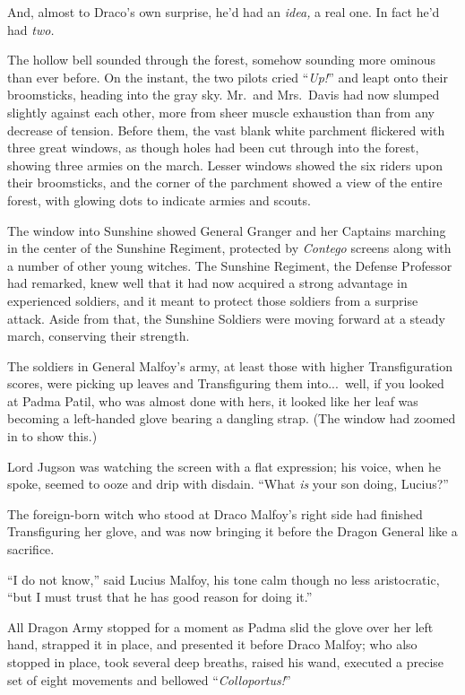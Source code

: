 And, almost to Draco’s own surprise, he’d had an \emph{idea,} a
real one. In fact he’d had \emph{two.}

The hollow bell sounded through the forest, somehow sounding
more ominous than ever before. On the instant, the two pilots cried
“\emph{Up!}” and leapt onto their broomsticks, heading into the
gray sky.
\sbreak
Mr.~and Mrs.~Davis had now slumped slightly against each other,
more from sheer muscle exhaustion than from any decrease of
tension. Before them, the vast blank white parchment flickered with
three great windows, as though holes had been cut through into the
forest, showing three armies on the march. Lesser windows showed
the six riders upon their broomsticks, and the corner of the
parchment showed a view of the entire forest, with glowing dots to
indicate armies and scouts.

The window into Sunshine showed General Granger and her Captains
marching in the center of the Sunshine Regiment, protected by
\emph{Contego} screens along with a number of other young witches.
The Sunshine Regiment, the Defense Professor had remarked, knew
well that it had now acquired a strong advantage in experienced
soldiers, and it meant to protect those soldiers from a surprise
attack. Aside from that, the Sunshine Soldiers were moving forward
at a steady march, conserving their strength.

The soldiers in General Malfoy’s army, at least those with
higher Transfiguration scores, were picking up leaves and
Transfiguring them into...\ well, if you looked at Padma Patil, who
was almost done with hers, it looked like her leaf was becoming a
left-handed glove bearing a dangling strap. (The window had zoomed
in to show this.)

Lord Jugson was watching the screen with a flat expression; his
voice, when he spoke, seemed to ooze and drip with disdain. “What
\emph{is} your son doing, Lucius?”

The foreign-born witch who stood at Draco Malfoy’s right side
had finished Transfiguring her glove, and was now bringing it
before the Dragon General like a sacrifice.

“I do not know,” said Lucius Malfoy, his tone calm though no
less aristocratic, “but I must trust that he has good reason for
doing it.”

All Dragon Army stopped for a moment as Padma slid the glove
over her left hand, strapped it in place, and presented it before
Draco Malfoy; who also stopped in place, took several deep breaths,
raised his wand, executed a precise set of eight movements and
bellowed “\emph{Colloportus!}”

